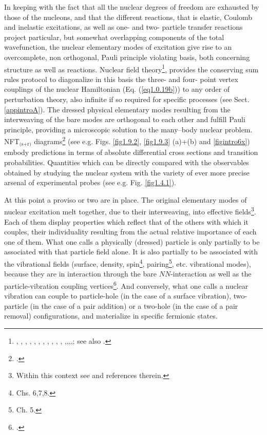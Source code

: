 In keeping with the fact that all the nuclear degrees of freedom are exhausted by those of the nucleons, and that the different reactions, that is elastic, Coulomb and inelastic excitations, as well as  one- and two- particle transfer reactions project particular, but somewhat
 overlapping  components of the total wavefunction, the nuclear elementary modes of excitation give  rise to an overcomplete, non orthogonal, Pauli principle violating basis, both concerning structure as well as reactions.  Nuclear field theory\footnote{\cite{Bes:74}, \cite{Bes:76a}, \cite{Bes:76b}, \cite{Bes:76c}, \cite{Bes:75}, \cite{Broglia:76}, \cite{Bes:75b}, \cite{Mottelson:76}, \cite{Bes:77}, \cite{Bortignon:77}, \cite{Bortignon:78}, \cite{Broglia:04a},\cite{Reinhardt:75},\cite{Reinhardt:78a},\cite{Reinhardt:78b},\cite{Reinhardt:80}; see also \cite{Bohr:19}.}, provides the conserving sum rules protocol to diagonalize in this basis the three- and four- point vertex couplings of the nuclear Hamiltonian (Eq. (\ref{eq1.0.19b}))  to any order of perturbation theory, also infinite if so required for specific processes (see Sect. \ref{appintroA}). The dressed physical elementary modes resulting from the interweaving of the bare modes are orthogonal to each other and fulfill Pauli principle, providing a microscopic solution to the many--body nuclear problem. 
 NFT$_{\text{(s+r)}}$ diagrams\footnote{\cite{Broglia:75,Broglia:04a,Broglia:16}.} (see e.g. Figs. \ref{fig1.9.2}, \ref{fig1.9.3} (a)+(b) and  \ref{figintro6x}) embody predictions  in terms of absolute differential cross sections and transition probabilities. Quantities which can be directly compared with the observables obtained by studying the nuclear system with  the variety of ever more precise arsenal of experimental probes (see e.g. Fig. \ref{fig1.4.1}). 

At this point a proviso or two are in place. The original elementary modes of nuclear excitation melt together, due to their interweaving, into effective fields\footnote{Within this context see \cite{Dickhoff:05} and references therein.}. Each of them display properties which reflect that of  the others with which it couples, their individuality resulting from the actual relative importance of each one of them. What one calls a physically  (dressed) particle is only partially to be associated with that particle field alone. It is also partially to be associated with the  vibrational fields
 (surface, density, spin\footnote{\cite{Bertsch:05} Chs. 6,7,8.}, pairing\footnote{\cite{Brink:05} Ch. 5.}, etc. vibrational modes), 
 because they are in interaction through the bare $NN$-interaction as well as the particle-vibration coupling vertices\footnote{\cite{Bohr:75}.}. And conversely, what one calls a nuclear vibration can couple to  particle-hole (in the case of a surface vibration),  two-particle (in the case of a pair addition) or a two-hole (in the case of a pair removal)  configurations, and materialize in specific fermionic states. 
 
